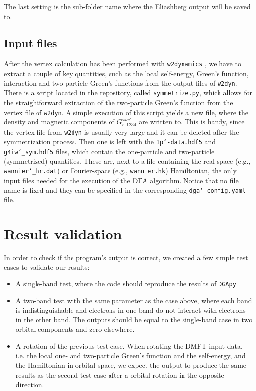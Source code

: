 \documentclass[../../main.tex]{subfiles}
\begin{document}
The last setting is the sub-folder name where the Eliashberg output will be saved to.
 
\subsection{Input files}

After the vertex calculation has been performed with \texttt{w2dynamics} \cite{Wallerberger2019}, we have to extract a couple of key quantities, such as the local self-energy, Green's function, interaction and two-particle Green's functions from the output files of \texttt{w2dyn}. There is a script located in the repository, called \texttt{symmetrize.py}, which allows for the straightforward extraction of the two-particle Green's function from the vertex file of \texttt{w2dyn}. A simple execution of this script yields a new file, where the density and magnetic components of $G^{\omega\nu\nu'}_{r;\mathfrak{1234}}$ are written to. This is handy, since the vertex file from \texttt{w2dyn} is usually very large and it can be deleted after the symmetrization process. Then one is left with the \texttt{1p\char`-data.hdf5} and \texttt{g4iw\char`_sym.hdf5} files, which contain the one-particle and two-particle (symmetrized) quantities. These are, next to a file containing the real-space (e.g., \texttt{wannier\char`_hr.dat}) or Fourier-space (e.g., \texttt{wannier.hk}) Hamiltonian, the only input files needed for the execution of the $\text{D}\Gamma\text{A}$ algorithm. Notice that no file name is fixed and they can be specified in the corresponding \texttt{dga\char`_config.yaml} file.

\section{Result validation}

In order to check if the program's output is correct, we created a few simple test cases to validate our results:
\begin{itemize}
\item A single-band test, where the code should reproduce the results of \texttt{DGApy}
\item A two-band test with the same parameter as the case above, where each band is indistinguishable and electrons in one band do not interact with electrons in the other band. The outputs should be equal to the single-band case in two orbital components and zero elsewhere.
\item A rotation of the previous test-case. When rotating the DMFT input data, i.e. the local one- and two-particle Green's function and the self-energy, and the Hamiltonian in orbital space, we expect the output to produce the same results as the second test case after a orbital rotation in the opposite direction.
\end{itemize}
\end{document}

